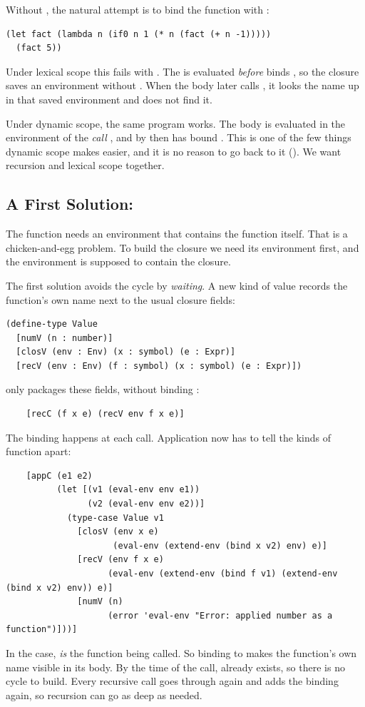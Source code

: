Without , the natural attempt is to bind the function with :
\begin{lstlisting}
(let fact (lambda n (if0 n 1 (* n (fact (+ n -1)))))
  (fact 5))
\end{lstlisting}
Under lexical scope this fails with . The  is evaluated \emph{before}  binds , so the closure saves an environment without . When the body later calls , it looks the name up in that saved environment and does not find it.

Under dynamic scope, the same program works. The body is evaluated in the environment of the \emph{call} , and by then  has bound . This is one of the few things dynamic scope makes easier, and it is no reason to go back to it (). We want recursion and lexical scope together.

\subsection{A First Solution: }

The function needs an environment that contains the function itself. That is a chicken-and-egg problem. To build the closure we need its environment first, and the environment is supposed to contain the closure.

The first solution avoids the cycle by \emph{waiting}. A new kind of value records the function's own name next to the usual closure fields:
\begin{lstlisting}
(define-type Value
  [numV (n : number)]
  [closV (env : Env) (x : symbol) (e : Expr)]
  [recV (env : Env) (f : symbol) (x : symbol) (e : Expr)])
\end{lstlisting}
 only packages these fields, without binding :
\begin{lstlisting}
    [recC (f x e) (recV env f x e)]
\end{lstlisting}
The binding happens at each call. Application now has to tell the kinds of function apart:
\begin{lstlisting}
    [appC (e1 e2)
          (let [(v1 (eval-env env e1))
                (v2 (eval-env env e2))]
            (type-case Value v1
              [closV (env x e)
                     (eval-env (extend-env (bind x v2) env) e)]
              [recV (env f x e)
                    (eval-env (extend-env (bind f v1) (extend-env (bind x v2) env)) e)]
              [numV (n)
                    (error 'eval-env "Error: applied number as a function")]))]
\end{lstlisting}
In the  case,  \emph{is} the function being called. So binding  to  makes the function's own name visible in its body. By the time of the call,  already exists, so there is no cycle to build. Every recursive call goes through  again and adds the binding again, so recursion can go as deep as needed.

